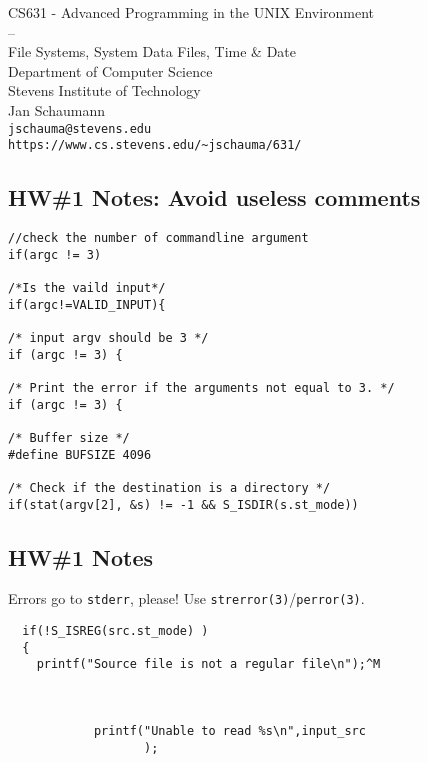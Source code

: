 \documentclass[xga]{xdvislides}
\begin{document}
\setfontphv

\lhead{\slidetitle}
\cfoot{\relax}
\rfoot{\Gray{\today}}

\vspace*{\fill}
\begin{center}
	\Hugesize
		CS631 - Advanced Programming in the UNIX Environment\\
		-- \\
		File Systems, System Data Files, Time \& Date
	\hspace*{5mm}\blueline\\ [1em]
	\Normalsize
		Department of Computer Science\\
		Stevens Institute of Technology\\
		Jan Schaumann\\
		\verb+jschauma@stevens.edu+\\
		\verb+https://www.cs.stevens.edu/~jschauma/631/+
\end{center}
\vspace*{\fill}

\subsection{HW\#1 Notes: Avoid useless comments}
\begin{verbatim}
//check the number of commandline argument
if(argc != 3)

/*Is the vaild input*/
if(argc!=VALID_INPUT){

/* input argv should be 3 */
if (argc != 3) {

/* Print the error if the arguments not equal to 3. */
if (argc != 3) {

/* Buffer size */
#define BUFSIZE 4096

/* Check if the destination is a directory */
if(stat(argv[2], &s) != -1 && S_ISDIR(s.st_mode))
\end{verbatim}
\Normalsize

\subsection{HW\#1 Notes}
Errors go to \verb+stderr+, please!  Use
\verb+strerror(3)+/\verb+perror(3)+. \\

\begin{verbatim}
  if(!S_ISREG(src.st_mode) )
  {
    printf("Source file is not a regular file\n");^M



            printf("Unable to read %s\n",input_src
                   );

\end{verbatim}
\end{document}
